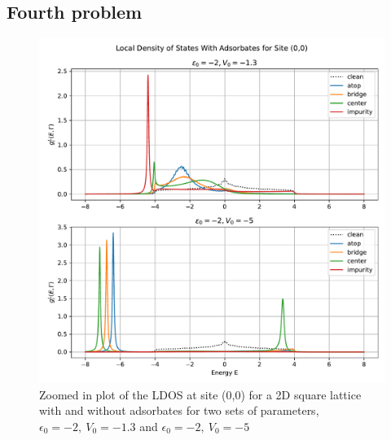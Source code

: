 \subsection{Fourth problem}


\begin{figure}[H]
    \centering    \includegraphics[width=\textwidth]{Figures/task4-11.pdf}
    \caption{Zoomed in plot of the LDOS at site (0,0) for a 2D square lattice with and without adsorbates for two sets of parameters, $\epsilon_0=-2,\:V_0=-1.3$ and $\epsilon_0=-2,\:V_0=-5$}
    \label{fig:task4}
\end{figure}


